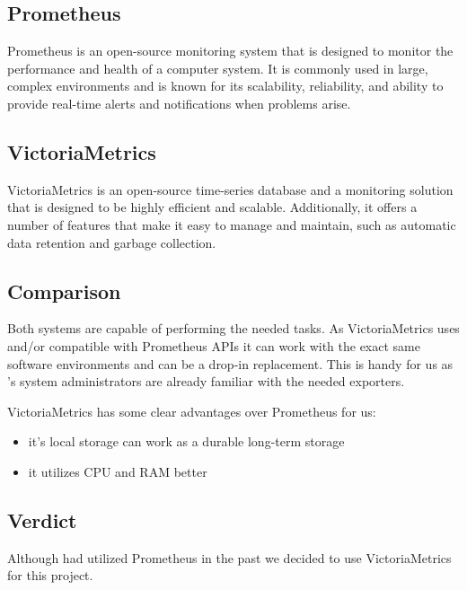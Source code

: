 \subsection{Prometheus \label{bbPrometheus}}

Prometheus\cite{prom} is an open-source monitoring system that is designed to monitor the
performance and health of a computer system. It is commonly used in large,
complex environments and is known for its scalability, reliability, and ability
to provide real-time alerts and notifications when problems arise.

\subsection{VictoriaMetrics}

VictoriaMetrics\cite{vm} is an open-source time-series database and a monitoring
solution that is designed to be highly efficient and scalable. Additionally, it
offers a number of features that make it easy to manage and maintain, such as
automatic data retention and garbage collection.

\subsection{Comparison}

Both systems are capable of performing the needed tasks. As VictoriaMetrics
uses and/or compatible with Prometheus APIs it can work with the exact same
software environments and can be a drop-in replacement. This is handy for us as
\kszk's system administrators are already familiar with the needed exporters.

VictoriaMetrics has some clear advantages over Prometheus for us\cite{vmspeed}:
\begin{itemize}
	\item it's local storage can work as a durable long-term storage %
	\item it utilizes CPU and RAM better
\end{itemize}

\subsection{Verdict}

Although \kszk had utilized Prometheus in the past we decided to use
VictoriaMetrics for this project.

